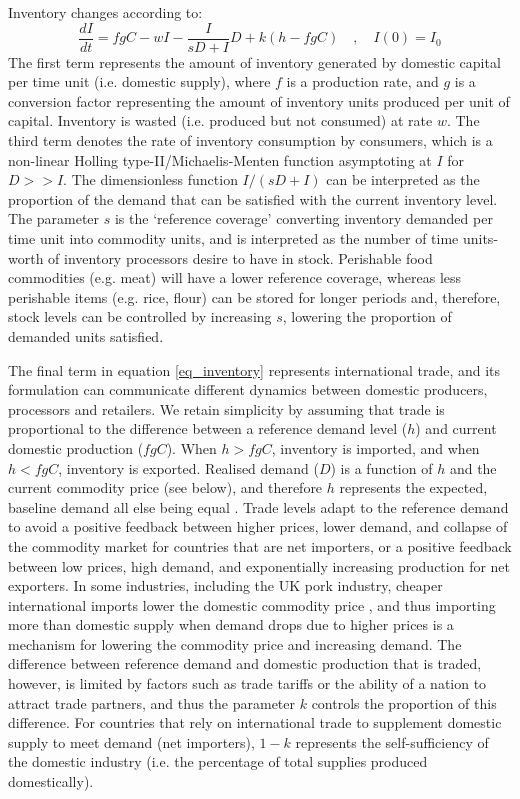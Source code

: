 \documentclass[9pt,twocolumn,twoside,lineno]{pnas-new}
\begin{document}
Inventory changes according to:
%
\begin{equation}
  \frac{dI}{dt} = f g C - w I - \frac{I}{sD + I} D + k (h - f g C) \quad, \quad I(0) = I_0
  \label{eq_inventory}
\end{equation}
%
The first term represents the amount of inventory generated by domestic capital per time unit (i.e. domestic supply), where $f$ is a production rate, and $g$ is a conversion factor representing the amount of inventory units produced per unit of capital. Inventory is wasted (i.e. produced but not consumed) at rate $w$. The third term denotes the rate of inventory consumption by consumers, which is a non-linear Holling type-II/Michaelis-Menten function asymptoting at $I$ for $D >> I$. The dimensionless function $I/(sD + I)$ can be interpreted as the proportion of the demand that can be satisfied with the current inventory level. The parameter $s$ is the `reference coverage' converting inventory demanded per time unit into commodity units, and is interpreted as the number of time units-worth of inventory processors desire to have in stock. Perishable food commodities (e.g. meat) will have a lower reference coverage, whereas less perishable items (e.g. rice, flour) can be stored for longer periods and, therefore, stock levels can be controlled by increasing $s$, lowering the proportion of demanded units satisfied.

The final term in equation \ref{eq_inventory} represents international trade, and its formulation can communicate different dynamics between domestic producers, processors and retailers. We retain simplicity by assuming that trade is proportional to the difference between a reference demand level ($h$) and current domestic production ($f g C$). When $h > f g C$, inventory is imported, and when $h < f g C$, inventory is exported. Realised demand ($D$) is a function of $h$ and the current commodity price (see below), and therefore $h$ represents the expected, baseline demand all else being equal \cite{sterman2000}. Trade levels adapt to the reference demand to avoid a positive feedback between higher prices, lower demand, and collapse of the commodity market for countries that are net importers, or a positive feedback between low prices, high demand, and exponentially increasing production for net exporters. In some industries, including the UK pork industry, cheaper international imports lower the domestic commodity price \cite{AHDBeuroexhange2015}, and thus importing more than domestic supply when demand drops due to higher prices is a mechanism for lowering the commodity price and increasing demand. The difference between reference demand and domestic production that is traded, however, is limited by factors such as trade tariffs \cite{feng2017} or the ability of a nation to attract trade partners, and thus the parameter $k$ controls the proportion of this difference. For countries that rely on international trade to supplement domestic supply to meet demand (net importers), $1 - k$ represents the self-sufficiency of the domestic industry (i.e. the percentage of total supplies produced domestically).
\end{document}
